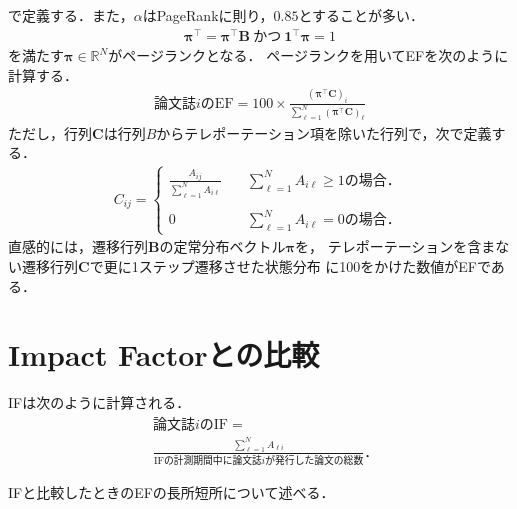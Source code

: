 で定義する．また，$\alpha$はPageRankに則り，$0.85$とすることが多い．
\begin{align*}
    \bm{\pi}^{\top} = \bm{\pi}^{\top}\bm{B}~\text{かつ}~ \bm{1}^{\top}\bm{\pi}=1
\end{align*}
を満たす$\bm{\pi} \in \mathbb{R}^N$がページランクとなる．
ページランクを用いてEFを次のように計算する．
\begin{align*}
    \text{論文誌$i$のEF} = 100 \times \frac{( \bm{\pi}^{\top} \bm{C} )_i}{\sum_{\ell=1}^N ( \bm{\pi}^{\top} \bm{C} )_{\ell}}
\end{align*}
ただし，行列$\bm{C}$は行列$B$からテレポーテーション項を除いた行列で，次で定義する\cite{Masuda2013}．
\begin{align*}
    C_{ij} =
    \begin{cases}
        \frac{A_{ij}}{\sum_{\ell=1}^N A_{i\ell}}
        &\quad \sum_{\ell=1}^N A_{i\ell} \geq 1\text{の場合．} \\
        \\
        0
        &\quad \sum_{\ell=1}^N A_{i\ell} =0\text{の場合．} 
    \end{cases}
\end{align*}
直感的には，遷移行列$\bm{B}$の定常分布ベクトル$\bm{\pi}$を，
テレポーテーションを含まない遷移行列$\bm{C}$で更に1ステップ遷移させた状態分布
に100をかけた数値がEFである．


\section{Impact Factorとの比較}
IFは次のように計算される．
\begin{align*}
    & \text{論文誌$i$のIF} = \\
    & \frac{\sum_{\ell=1}^N A_{\ell i}}{\text{IFの計測期間中に論文誌$i$が発行した論文の総数}}．
\end{align*}

IFと比較したときのEFの長所短所について述べる．
